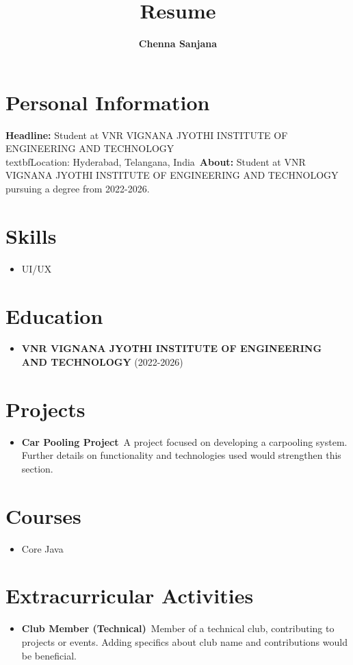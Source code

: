 \documentclass[a4paper, 12pt]{article}
\begin{document}
\title{\textbf{Resume}}
\author{\textbf{Chenna Sanjana}}
\date{}
\maketitle

\section*{Personal Information}
\textbf{Headline:} Student at VNR VIGNANA JYOTHI INSTITUTE OF ENGINEERING AND TECHNOLOGY\\textbf{Location:} Hyderabad, Telangana, India\
\textbf{About:} Student at VNR VIGNANA JYOTHI INSTITUTE OF ENGINEERING AND TECHNOLOGY pursuing a degree from 2022-2026.

\section*{Skills}
\begin{itemize}
    \item UI/UX
\end{itemize}

\section*{Education}
\begin{itemize}
    \item \textbf{VNR VIGNANA JYOTHI INSTITUTE OF ENGINEERING AND TECHNOLOGY} (2022-2026)
\end{itemize}

\section*{Projects}
\begin{itemize}
    \item \textbf{Car Pooling Project}\
    A project focused on developing a carpooling system. Further details on functionality and technologies used would strengthen this section.
\end{itemize}

\section*{Courses}
\begin{itemize}
    \item Core Java
\end{itemize}

\section*{Extracurricular Activities}
\begin{itemize}
    \item \textbf{Club Member (Technical)}\
    Member of a technical club, contributing to projects or events. Adding specifics about club name and contributions would be beneficial.
\end{itemize}
\end{document}

